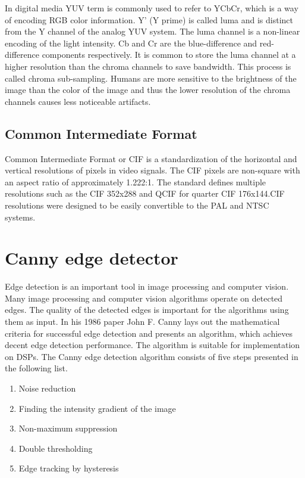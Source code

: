 In digital media YUV term is commonly used to refer to YCbCr, which is a way of encoding RGB color information. Y' (Y prime) is called luma and is distinct from the Y channel of the analog YUV system. The luma channel is a non-linear encoding of the light intensity. Cb and Cr are the blue-difference and red-difference components respectively. It is common to store the luma channel at a higher resolution than the chroma channels to save bandwidth. This process is called chroma sub-sampling. Humans are more sensitive to the brightness of the image than the color of the image and thus the lower resolution of the chroma channels causes less noticeable artifacts.~\cite{jack2011video}

\subsection{Common Intermediate Format}
\label{subsec:cif}
Common Intermediate Format or CIF is a standardization of the horizontal and vertical resolutions of pixels in video signals. The CIF pixels are non-square with an aspect ratio of approximately 1.222:1. The standard defines multiple resolutions such as the CIF 352x288 and QCIF for quarter CIF 176x144.CIF resolutions were designed to be easily convertible to the PAL and NTSC systems.~\cite{telecommunication1993itu}

\section{Canny edge detector}
\label{sec:canny}
Edge detection is an important tool in image processing and computer vision. Many image processing and computer vision algorithms operate on detected edges. The quality of the detected edges is important for the algorithms using them as input. In his 1986 paper John F. Canny \cite{canny1986computational} lays out the mathematical criteria for successful edge detection and presents an algorithm, which achieves decent edge detection performance. The algorithm is suitable for implementation on DSPs. The Canny edge detection algorithm consists of five steps presented in the following list.

\begin{enumerate}
    \item{Noise reduction}
    \item{Finding the intensity gradient of the image}
    \item{Non-maximum suppression}
    \item{Double thresholding}
    \item{Edge tracking by hysteresis}
\end{enumerate}

